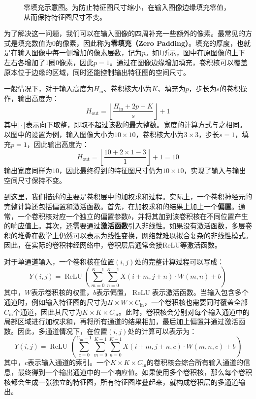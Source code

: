\begin{figure}[H]
    \caption{零填充示意图。为防止特征图尺寸缩小，在输入图像边缘填充零值，从而保持特征图尺寸不变。}
    \label{fig:padding}
\end{figure}

为了解决这一问题，我们可以在输入图像的四周补充一些额外的像素。最常见的方式是填充数值为$0$的像素，因此称为\textbf{零填充（Zero Padding）}。填充的厚度，也就是在输入图像中每一侧增加的像素层数，记为$p$。如\cref{fig:padding}所示，图中在原图像的上下左右各增加了$1$圈$0$像素，因此$p=1$。通过在图像边缘增加填充，卷积核可以覆盖原本位于边缘的区域，同时还能控制输出特征图的空间尺寸。

一般情况下，对于输入高度为$H_{\text{in}}$、卷积核大小为$K$、填充为$p$，步长为$s$的卷积操作，输出高度为：
$$
H_{\text{out}} = \left\lfloor \frac{H_{\text{in}}+2p-K}{s} \right\rfloor+1
$$
其中$\lfloor \cdot \rfloor$表示向下取整，即取不超过该数的最大整数。宽度的计算方式与之相同。以图中的设置为例，输入图像大小为$10\times10$，卷积核大小为$3\times3$，步长$s=1$，填充$p=1$，因此输出高度为：
$$
H_{\text{out}} = \left\lfloor \frac{10+2\times1-3}{1} \right\rfloor+1 =10
$$
输出宽度同样为$10$，因此最终得到的特征图尺寸仍为$10\times10$，实现了输入与输出空间尺寸保持不变。

到这里，我们描述的主要是卷积层中的加权求和过程。实际上，一个卷积神经元的完整计算还包括偏置和激活函数。首先，在加权求和的结果上加上一个\textbf{偏置}。通常，一个卷积核对应一个独立的偏置参数$b$，并将其加到该卷积核在不同位置产生的响应值上。其次，还需要通过\textbf{激活函数}引入非线性。如果没有激活函数，多层卷积的堆叠在数学上仍然可以表示为线性变换，网络就难以拟合复杂的非线性模式。因此，在实际的卷积神经网络中，卷积层后通常会接ReLU等激活函数。

对于单通道输入，一个卷积核在位置$(i,j)$处的完整计算过程可以写成：
$$
Y(i,j) = \operatorname{ReLU} \left( \sum_{m=0}^{K-1} \sum_{n=0}^{K-1} X(i+m,j+n)\cdot W(m,n)+b \right)
$$
其中，$W$表示卷积核的权重，$b$表示偏置，$\operatorname{ReLU}$表示激活函数。当输入包含多个通道时，例如输入特征图的尺寸为$H\times W\times C_{\text{in}}$，一个卷积核也需要同时覆盖全部$C_{\text{in}}$个通道，因此其尺寸为$K\times K\times C_{\text{in}}$。此时，卷积核会分别对每个输入通道中的局部区域进行加权求和，再将所有通道的结果相加，最后加上偏置并通过激活函数。因此，多通道情况下，在位置$(i,j)$处的计算可以表示为：
$$
Y(i,j) = \operatorname{ReLU} \left( \sum_{c=0}^{C_{\text{in}}-1} \sum_{m=0}^{K-1} \sum_{n=0}^{K-1} X(i+m,j+n,c)\cdot W(m,n,c) +b \right)
$$
其中，$c$表示输入通道的索引。一个$K\times K\times C_{\text{in}}$的卷积核会综合所有输入通道的信息，最终得到一个输出通道中的一个响应值。如果使用多个卷积核，那么每个卷积核都会生成一张独立的特征图，所有特征图堆叠起来，就构成卷积层的多通道输出。

